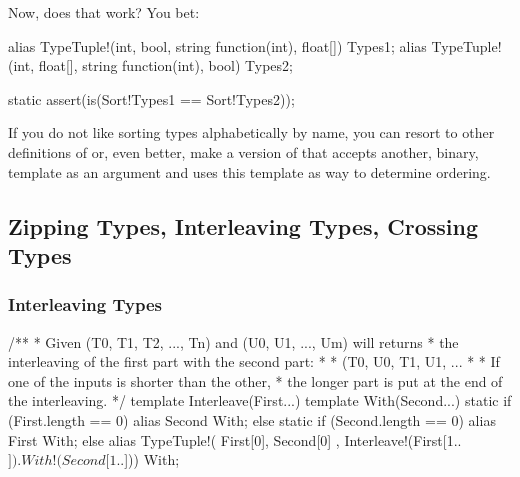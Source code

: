 Now, does that work? You bet:

\begin{dcode}
alias TypeTuple!(int, bool, string function(int), float[]) Types1;
alias TypeTuple!(int, float[], string function(int), bool) Types2;

static assert(is(Sort!Types1 == Sort!Types2));
\end{dcode}

If you do not like sorting types alphabetically by name, you can resort to other definitions of  or, even better, make a version of  that accepts another, binary, template as an argument and uses this template as way to determine ordering.



\subsection{Zipping Types, Interleaving Types, Crossing Types}


\subsubsection{Interleaving Types}\label{interleavingtypes}

\begin{dcode}
/**
 * Given (T0, T1, T2, ..., Tn) and (U0, U1, ..., Um) will returns
 * the interleaving of the first part with the second part: 
 *
 * (T0, U0, T1, U1, ...
 *
 * If one of the inputs is shorter than the other, 
 * the longer part is put at the end of the interleaving.
 */
template Interleave(First...)
{
    template With(Second...)
    {
	static if (First.length == 0)
	    alias Second With;
	else static if (Second.length == 0)
	    alias First With;
	else
	    alias TypeTuple!( First[0], Second[0]
	                    , Interleave!(First[1..$]).With!(Second[1..$])) 
             With;
    }
}

\end{dcode}

